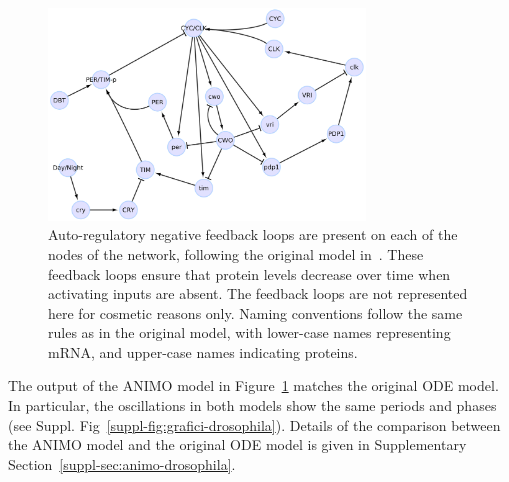 \documentclass{bmcart}
\def\tas{Timed Automata}
\begin{document}
\def\drosophilaGraphScale{0.069}%
\begin{figure}[!htpb]
\begin{center}
\includegraphics[width=0.75\textwidth]{images/drosophila_model5}%
\end{center}
\caption{
Auto-regulatory negative feedback loops are present on each of the nodes of
the network, following the original model in~\cite{drosophila-ode-model}. These feedback loops ensure that
protein levels decrease over time when activating inputs are absent. The feedback loops are not represented here
for cosmetic reasons only.
Naming conventions follow the same rules
as in the original model, with lower-case names representing mRNA, and upper-case names indicating proteins.
}\label{fig:drosophila-model}
\end{figure}


The output of the ANIMO model in Figure~\ref{fig:drosophila-model} matches the original ODE model.
In particular, the oscillations in both models show the same periods and phases (see Suppl. Fig~\ref{suppl-fig:grafici-drosophila}).
Details of the comparison
between the ANIMO model and the original ODE model is given in Supplementary Section~\ref{suppl-sec:animo-drosophila}.
\end{document}
